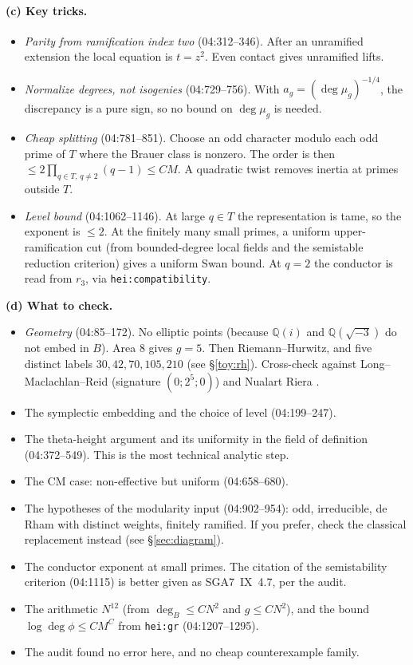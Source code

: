 \documentclass[11pt]{article}
\theoremstyle{definition}
\newcommand{\Q}{\mathbb Q}
\newcommand{\lbl}[1]{\texttt{#1}}
\newcommand{\src}[1]{\textsf{#1}}
\newcommand{\checkhead}{\par\smallskip\noindent\textbf{(d) What to check.}\ }
\begin{document}
\paragraph{(c) Key tricks.}
\begin{itemize}
\item \emph{Parity from ramification index two} (\src{04:312--346}).  After
an unramified extension the local equation is $t=z^2$.  Even contact
gives unramified lifts.
\item \emph{Normalize degrees, not isogenies} (\src{04:729--756}).  With
$a_g=(\deg\mu_g)^{-1/4}$, the discrepancy is a pure sign, so no bound on
$\deg\mu_g$ is needed.
\item \emph{Cheap splitting} (\src{04:781--851}).  Choose an odd character
modulo each odd prime of $T$ where the Brauer class is nonzero.  The order
is then $\le 2\prod_{q\in T,\,q\ne2}(q-1)\le CM$.  A quadratic twist removes
inertia at primes outside $T$.
\item \emph{Level bound} (\src{04:1062--1146}).  At large $q\in T$ the
representation is tame, so the exponent is $\le2$.  At the finitely many
small primes, a uniform upper-ramification cut (from bounded-degree local
fields and the semistable reduction criterion) gives a uniform Swan bound.
At $q=2$ the conductor is read from $r_3$, via \lbl{hei:compatibility}.
\end{itemize}

\checkhead
\begin{itemize}
\item \emph{Geometry} (\src{04:85--172}).  No elliptic points (because
$\Q(i)$ and $\Q(\sqrt{-3})$ do not embed in $B$).  Area $8$ gives $g=5$.
Then Riemann--Hurwitz, and five distinct labels $30,42,70,105,210$ (see
\S\ref{toy:rh}).  Cross-check against Long--Maclachlan--Reid (signature
$(0;2^5;0)$) and Nualart Riera \cite{LongMaclachlanReid2006,Nualart2015}.
\item The symplectic embedding and the choice of level (\src{04:199--247}).
\item The theta-height argument and its uniformity in the field of
definition (\src{04:372--549}).  This is the most technical analytic step.
\item The CM case: non-effective but uniform (\src{04:658--680}).
\item The hypotheses of the modularity input (\src{04:902--954}): odd,
irreducible, de Rham with distinct weights, finitely ramified.  If you
prefer, check the classical replacement instead (see \S\ref{sec:diagram}).
\item The conductor exponent at small primes.  The citation of the
semistability criterion (\src{04:1115}) is better given as SGA7~IX~4.7,
per the audit.
\item The arithmetic $N^{12}$ (from $\deg_B\le CN^2$ and $g\le CN^2$), and
the bound $\log\deg\phi\le CM^C$ from \lbl{hei:gr} (\src{04:1207--1295}).
\item The audit found no error here, and no cheap counterexample family.
\end{itemize}
\end{document}
